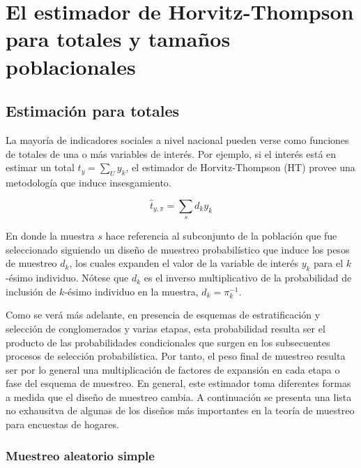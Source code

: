 \documentclass[
  12pt,
  spanish,
]{book}
\begin{document}
\hypertarget{el-estimador-de-horvitz-thompson-para-totales-y-tamauxf1os-poblacionales}{%
\section{El estimador de Horvitz-Thompson para totales y tamaños poblacionales}\label{el-estimador-de-horvitz-thompson-para-totales-y-tamauxf1os-poblacionales}}

\hypertarget{estimaciuxf3n-para-totales}{%
\subsection{Estimación para totales}\label{estimaciuxf3n-para-totales}}

La mayoría de indicadores sociales a nivel nacional pueden verse como funciones de totales de una o más variables de interés. Por ejemplo, si el interés está en estimar un total \(t_y=\sum_U y_k\), el estimador de Horvitz-Thompson (HT) provee una metodología que induce insesgamiento.

\[
\hat{t}_{y, \pi} = \sum_s d_k y_k
\]

En donde la muestra \(s\) hace referencia al subconjunto de la población que fue seleccionado siguiendo un diseño de muestreo probabilístico que induce los pesos de muestreo \(d_k\), los cuales expanden el valor de la variable de interés \(y_k\) para el \(k\)-ésimo individuo. Nótese que \(d_k\) es el inverso multiplicativo de la probabilidad de inclusión de \(k\)-ésimo individuo en la muestra, \(d_k = \pi_k^{-1}\).

Como se verá más adelante, en presencia de esquemas de estratificación y selección de conglomerados y varias etapas, esta probabilidad resulta ser el producto de las probabilidades condicionales que surgen en los subsecuentes procesos de selección probabilística. Por tanto, el peso final de muestreo resulta ser por lo general una multiplicación de factores de expansión en cada etapa o fase del esquema de muestreo. En general, este estimador toma diferentes formas a medida que el diseño de muestreo cambia. A continuación se presenta una lista no exhausitva de algunas de los diseños más importantes en la teoría de muestreo para encuestas de hogares.

\hypertarget{muestreo-aleatorio-simple-1}{%
\subsubsection{Muestreo aleatorio simple}\label{muestreo-aleatorio-simple-1}}
\end{document}
